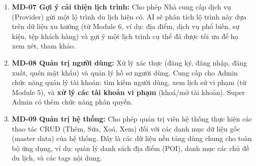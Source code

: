 \begin{enumerate}
    \item \textbf{MD-07 Gợi ý cải thiện lịch trình:} Cho phép Nhà cung cấp dịch vụ (Provider) gửi một lộ trình du lịch hiện có. AI sẽ phân tích lộ trình này dựa trên dữ liệu xu hướng (từ Module 6, ví dụ: địa điểm, dịch vụ phổ biến, sự kiện, tệp khách hàng) và gợi ý một lịch trình cụ thể đã được tối ưu để họ xem xét, tham khảo.

    \item \textbf{MD-08 Quản trị người dùng:} Xử lý xác thực (đăng ký, đăng nhập, đăng xuất, quên mật khẩu) và quản lý hồ sơ người dùng. Cung cấp cho Admin chức năng quản lý tài khoản: tìm kiếm người dùng, xem lịch sử vi phạm (từ Module 5), và \textbf{xử lý các tài khoản vi phạm} (khoá/mở tài khoản). Super Admin có thêm chức năng phân quyền.
    
    \item \textbf{MD-09 Quản trị hệ thống:} Cho phép quản trị viên hệ thống thực hiện các thao tác CRUD (Thêm, Sửa, Xoá, Xem) đối với các danh mục dữ liệu gốc (master data) của hệ thống. Đây là các dữ liệu nền tảng dùng chung cho toàn bộ ứng dụng, ví dụ: quản lý danh sách địa điểm (POI), danh mục các chủ đề du lịch, và các tags nội dung.
\end{enumerate}
